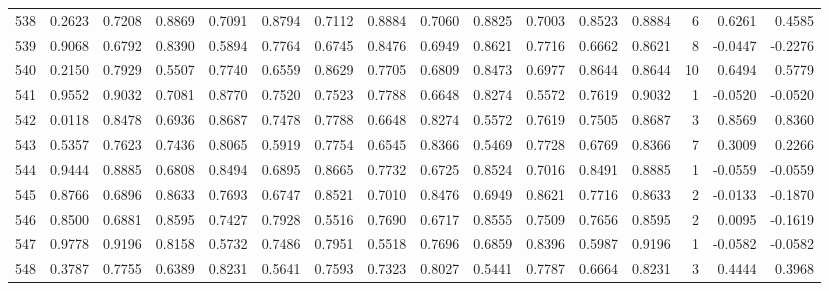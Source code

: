 \begin{tabular}{lrrrrrrrrrrrrrrr}
538 &      0.2623 &  0.7208 &  0.8869 &  0.7091 &  0.8794 &  0.7112 &  0.8884 &  0.7060 &  0.8825 &  0.7003 &   0.8523 &     0.8884 &      6 &                    0.6261 &                     0.4585 \\
539 &      0.9068 &  0.6792 &  0.8390 &  0.5894 &  0.7764 &  0.6745 &  0.8476 &  0.6949 &  0.8621 &  0.7716 &   0.6662 &     0.8621 &      8 &                   -0.0447 &                    -0.2276 \\
540 &      0.2150 &  0.7929 &  0.5507 &  0.7740 &  0.6559 &  0.8629 &  0.7705 &  0.6809 &  0.8473 &  0.6977 &   0.8644 &     0.8644 &     10 &                    0.6494 &                     0.5779 \\
541 &      0.9552 &  0.9032 &  0.7081 &  0.8770 &  0.7520 &  0.7523 &  0.7788 &  0.6648 &  0.8274 &  0.5572 &   0.7619 &     0.9032 &      1 &                   -0.0520 &                    -0.0520 \\
542 &      0.0118 &  0.8478 &  0.6936 &  0.8687 &  0.7478 &  0.7788 &  0.6648 &  0.8274 &  0.5572 &  0.7619 &   0.7505 &     0.8687 &      3 &                    0.8569 &                     0.8360 \\
543 &      0.5357 &  0.7623 &  0.7436 &  0.8065 &  0.5919 &  0.7754 &  0.6545 &  0.8366 &  0.5469 &  0.7728 &   0.6769 &     0.8366 &      7 &                    0.3009 &                     0.2266 \\
544 &      0.9444 &  0.8885 &  0.6808 &  0.8494 &  0.6895 &  0.8665 &  0.7732 &  0.6725 &  0.8524 &  0.7016 &   0.8491 &     0.8885 &      1 &                   -0.0559 &                    -0.0559 \\
545 &      0.8766 &  0.6896 &  0.8633 &  0.7693 &  0.6747 &  0.8521 &  0.7010 &  0.8476 &  0.6949 &  0.8621 &   0.7716 &     0.8633 &      2 &                   -0.0133 &                    -0.1870 \\
546 &      0.8500 &  0.6881 &  0.8595 &  0.7427 &  0.7928 &  0.5516 &  0.7690 &  0.6717 &  0.8555 &  0.7509 &   0.7656 &     0.8595 &      2 &                    0.0095 &                    -0.1619 \\
547 &      0.9778 &  0.9196 &  0.8158 &  0.5732 &  0.7486 &  0.7951 &  0.5518 &  0.7696 &  0.6859 &  0.8396 &   0.5987 &     0.9196 &      1 &                   -0.0582 &                    -0.0582 \\
548 &      0.3787 &  0.7755 &  0.6389 &  0.8231 &  0.5641 &  0.7593 &  0.7323 &  0.8027 &  0.5441 &  0.7787 &   0.6664 &     0.8231 &      3 &                    0.4444 &                     0.3968 \\

\end{tabular}
